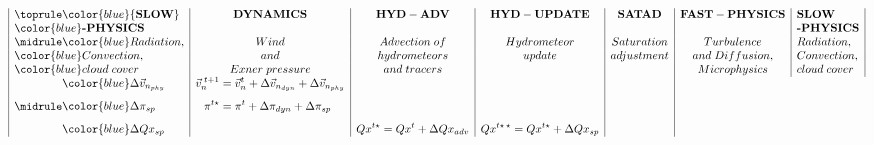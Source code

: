 \jot=8pt
\begin{align*}
\begin{array}{|l|c|c|c|c|c|l|}
\toprule
\color{blue}{\bf SLOW} & {\bf DYNAMICS}& {\bf HYD-ADV} &  {\bf HYD-UPDATE} &{\bf
 SATAD}&{\bf FAST-PHYSICS} & {\bf SLOW} \\ 
\color{blue}\textbf{-PHYSICS} &&&&&& \textbf{-PHYSICS}\\ 
\midrule
\color{blue} Radiation, &  Wind & Advection \; of & Hydrometeor  &
 Saturation & Turbulence   & Radiation, \\
\color{blue} Convection, & and  &hydrometeors &update & adjustment& and \;Diffusion,&  Convection, \\
\color{blue} cloud \;cover &Exner \; pressure & and \; tracers& & &  Microphysics&  cloud \; cover \\
\midrule
\begin{aligned}
&\color{blue} \Delta \vec{v}_{n_{phy}}\\[8pt]
&\color{blue} \Delta \pi_{sp} \\[8pt]
&\color{blue} \Delta Qx_{sp} 
 \end{aligned} &  
\begin{aligned}
   \vec{v}_n^{\; t+1}&=\vec{v}_n^t +\Delta
   \vec{v}_{n_{dyn}}+\Delta \vec{v}_{n_{phy}} \\[8pt]
 \pi^{t \star}&=\pi^{t} +\Delta \pi_{dyn}+\Delta \pi_{sp}\\[8pt]
&
\end{aligned}
&
\begin{aligned}
& \\[8pt]
& \\[8pt]
&Qx^{t \star}=Qx^{t}+\Delta Qx_{adv}\end{aligned} &
\begin{aligned}
& \\[8pt]
& \\[8pt]
& Qx^{t \star\,\star}=Qx^{t \star}+\Delta Qx_{sp}
\end{aligned}
 & 
\begin{aligned}
\\[8pt]

\end{aligned}
\end{array}
\end{align*}
